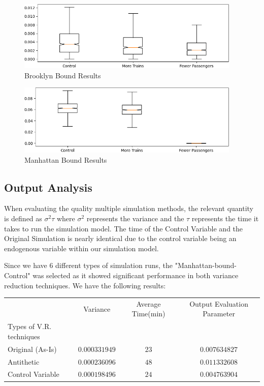 \documentclass[12pt]{article}
\begin{document}
\begin{figure}[h]
	\centering
	\caption{Brooklyn Bound Results}
	\label{Fig:brooklyn-results}
	\includegraphics[width=0.95\textwidth]{./figures/brookly-bound-results.png}
\end{figure}

\begin{figure}
	\centering
	\caption{Manhattan Bound Results}
	\label{Fig:manhattan-results}
	\includegraphics[width=0.95\textwidth]{./figures/manhattan-bound-results.png}
\end{figure}

\subsection {Output Analysis}

When evaluating the quality multiple simulation methods, the relevant quantity is defined as $ \sigma^{2} \tau $ where $\sigma^{2}$ represents the variance and the $\tau$ represents the time it takes to run the simulation model. The time of the Control Variable and the Original Simulation is nearly identical due to the control variable being an endogenous variable within our simulation model.

Since we have 6 different types of simulation runs, the "Manhattan-bound-Control" was selected as it showed significant performance in both variance reduction techniques. We have the following results:

\begin{center}
	\begin{tabular}{ l| c c c}
		                 & Variance      & Average Time(min) & Output Evaluation Parameter\\
		Types of V.R. techniques & & &\\
		  \hline
		Original (As-Is) & $0.000331949$ & $23$              & $0.007634827$\\ 
		Antithetic       & $0.000236096$ & $48$              & $0.011332608$\\  
		Control Variable & $0.000198496$ & $24$              & $0.004763904$\\

	\end{tabular}
\end{center}
\end{document}
